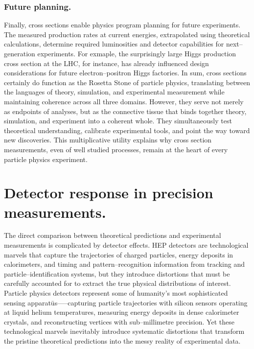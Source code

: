 \begin{definition}
            \subsubsection{Future planning.}
                Finally, cross sections enable physics program planning for future experiments.
                The measured production rates at current energies, extrapolated using theoretical calculations, determine required luminosities and detector capabilities for next--generation experiments.
                For exmaple, the surprisingly large Higgs production cross section at the LHC, for instance, has already influenced design considerations for future electron--positron Higgs factories.            
    In sum, cross sections certainly do function as the Rosetta Stone of particle physics, translating between the languages of theory, simulation, and experimental measurement while maintaining coherence across all three domains.
    However, they serve not merely as endpoints of analyses, but as the connective tissue that binds together theory, simulation, and experiment into a coherent whole.
    They simultaneously test theoretical understanding, calibrate experimental tools, and point the way toward new discoveries.
    This multiplicative utility explains why cross section measurements, even of well studied processes, remain at the heart of every particle physics experiment.

\section{Detector response in precision measurements.}
    The direct comparison between theoretical predictions and experimental measurements is complicated by detector effects.
    HEP detectors are technological marvels that capture the trajectories of charged particles, energy deposits in calorimeters, and timing and pattern--recognition information from tracking and particle--identification systems, but they introduce distortions that must be carefully accounted for to extract the true physical distributions of interest.
    Particle physics detectors represent some of humanity's most sophisticated sensing apparat\=us—--capturing particle trajectories with silicon sensors operating at liquid helium temperatures, measuring energy deposits in dense calorimeter crystals, and reconstructing vertices with sub--millimetre precision.
    Yet these technological marvels inevitably introduce systematic distortions that transform the pristine theoretical predictions into the messy reality of experimental data.
    

\end{definition}
